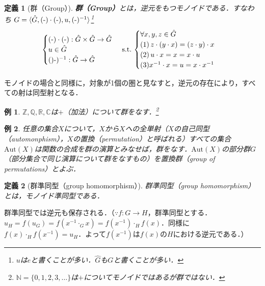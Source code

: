 \documentclass[dvipdfmx,a4j,10pt]{jsarticle}
\theoremstyle{mystyle1}
\theoremstyle{mystyle2}
\newtheorem{dfn*}{定義}
\newtheorem{example}{例}
\theoremstyle{mystyle3}
\begin{document}
\begin{dfn*}[群（Group）]
    \textbf{群（Group）}とは，逆元をもつモノイドである．すなわち
    $G=\langle \hat{G},(\mathchar`-)\cdot (\mathchar`-),u,(\mathchar`-)^{-1} \rangle$\footnote{$u$は$e$と書くことが多い．$\hat G$も$G$と書くことが多い．}\\
    \[
        \begin{cases}
            (\mathchar`-)\cdot(\mathchar`-):\hat{G}\times\hat{G}\to\hat{G} \\
            u\in\hat{G}                                                    \\
            ()\mathchar`-)^{-1}:\hat{G}\to\hat{G}
        \end{cases}\,\textrm{s.t.}\,
        \begin{cases}
            \forall x,y,z\in\hat{G}                          \\
            \textrm{(1)}\,z\cdot(y\cdot x)=(z\cdot y)\cdot x \\
            \textrm{(2)}\, u\cdot x=x=x\cdot u               \\
            \textrm{(3)} x^{-1}\cdot x=u=x\cdot x^{-1}
        \end{cases}
    \]
\end{dfn*}

モノイドの場合と同様に，対象が1個の圏と見なすと，逆元の存在により，すべての射は同型射となる．

\begin{example}
    $\mathbb{Z},\mathbb{Q},\mathbb{R},\mathbb{C}$は$+$（加法）について群をなす．\footnote{$\mathbb{N}=\{0,1,2,3,\ldots\}$は$+$についてモノイドではあるが群ではない．}
\end{example}

\begin{example}
    任意の集合$X$について，$X$から$X$への全単射（$X$の自己同型（automonphism），$X$の置換（permutation）と呼ばれる）すべての集合$\mathrm{Aut}(X)$は関数の合成を群の演算とみなせば，群をなす．$\mathrm{Aut}(X)$の部分群$G$（部分集合で同じ演算について群をなすもの）を置換群（group of permutations）とよぶ．
\end{example}

\begin{dfn*}[群準同型（group homomorphism）]
    群準同型（group homomorphism）とは，モノイド準同型である．
\end{dfn*}

群準同型では逆元も保存される．（$\because$$f:G\to H$，群準同型とする．$u_H=f(u_G)=f(x^{-1}\cdot_G x)=f(x^{-1})\cdot_H f(x)$．同様に$f(x)\cdot_H f(x^{-1})=u_H$．よって$f(x^{-1})$は$f(x)$の$H$における逆元である．）
\end{document}
